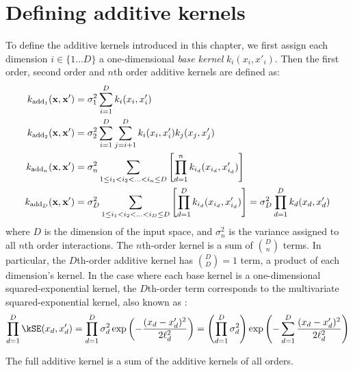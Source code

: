 



\section{Defining additive kernels}

To define the additive kernels introduced in this chapter, we first assign each dimension $i \in \{1 \dots D\}$ a one-dimensional \emph{base kernel} $k_i(x_i, x'_i)$.
Then the first order, second order and $n$th order additive kernels are defined as:
%
\begin{align}
k_{\textnormal{add}_1}({\bf x, x'}) & = \sigma_1^2 \sum_{i=1}^D k_i(x_i, x_i') \\
k_{\textnormal{add}_2}({\bf x, x'}) & = \sigma_2^2 \sum_{i=1}^D \sum_{j = i + 1}^D k_i(x_i, x_i') k_j(x_j, x_j') \\
k_{\textnormal{add}_n}({\bf x, x'}) & = \sigma_n^2 \sum_{1 \leq i_1 < i_2 < ... < i_n \leq D} \left[ \prod_{d=1}^n k_{i_d}(x_{i_d}, x_{i_d}') \right] \\
k_{\textnormal{add}_D}({\bf x, x'}) & = \sigma_D^2 \sum_{1 \leq i_1 < i_2 < ... < i_D \leq D} \left[ \prod_{d=1}^D k_{i_d}(x_{i_d}, x_{i_d}') \right] = \sigma_D^2 \prod_{d=1}^D k_{d}(x_{d}, x_{d}')
\end{align}
%
where $D$ is the dimension of the input space, and $\sigma_n^2$ is the variance assigned to all $n$th order interactions.
The $n$th-order kernel is a sum of ${D \choose n}$ terms.
In particular, the $D$th-order additive kernel has ${D \choose D} = 1$ term, a product of each dimension's kernel.
In the case where each base kernel is a one-dimensional squared-exponential kernel, the $D$th-order term corresponds to the multivariate squared-exponential kernel, also known as \seard{}:
%
\begin{align}
\prod_{d=1}^D \kSE(x_d, x_d') = 
\prod_{d=1}^D \sigma_d^2\exp \left( -\frac{ ( x_{d} - x_{d}')^2}{2 \ell^2_d} \right) = 
\left(\prod_{d=1}^D \sigma_d^2\right) \exp \left( -\sum_{d=1}^D \frac{ ( x_{d} - x_{d}')^2}{2 \ell^2_d} \right)
\end{align}
%

The full additive kernel is a sum of the additive kernels of all orders.

